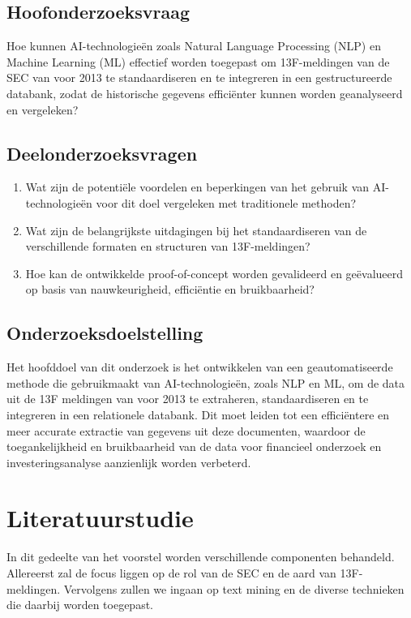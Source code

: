 \subsection{Hoofonderzoeksvraag}

Hoe kunnen AI-technologieën zoals Natural Language Processing (NLP) en Machine Learning (ML) effectief worden toegepast om 13F-meldingen van de SEC van voor 2013 te standaardiseren en te integreren in een gestructureerde databank, zodat de historische gegevens efficiënter kunnen worden geanalyseerd en vergeleken?

\subsection{Deelonderzoeksvragen}
\begin{enumerate}
    \item Wat zijn de potentiële voordelen en beperkingen van het gebruik van AI-technologieën voor dit doel vergeleken met traditionele methoden?
    \item Wat zijn de belangrijkste uitdagingen bij het standaardiseren van de verschillende formaten en structuren van 13F-meldingen?
    \item Hoe kan de ontwikkelde proof-of-concept worden gevalideerd en geëvalueerd op basis van nauwkeurigheid, efficiëntie en bruikbaarheid?
\end{enumerate}



\subsection{Onderzoeksdoelstelling}
Het hoofddoel van dit onderzoek is het ontwikkelen van een geautomatiseerde methode die gebruikmaakt van AI-technologieën, zoals NLP en ML, om de data uit de 13F meldingen van voor 2013 te extraheren, standaardiseren en te integreren in een relationele databank. Dit moet leiden tot een efficiëntere en meer accurate extractie van gegevens uit deze documenten, waardoor de toegankelijkheid en bruikbaarheid van de data voor financieel onderzoek en investeringsanalyse aanzienlijk worden verbeterd. 



\section{Literatuurstudie}%
\label{sec:literatuurstudie}
In dit gedeelte van het voorstel worden verschillende componenten behandeld. Allereerst zal de focus liggen op de rol van de SEC en de aard van 13F-meldingen. Vervolgens zullen we ingaan op text mining en de diverse technieken die daarbij worden toegepast.


